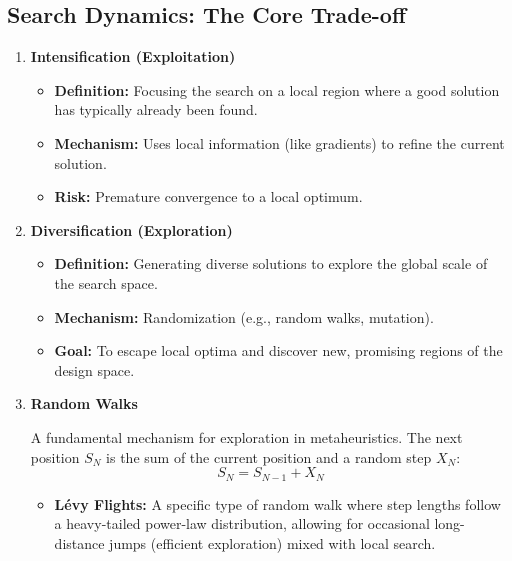 \documentclass[12pt]{article}
\begin{document}
\subsection{Search Dynamics: The Core Trade-off}
\begin{enumerate}
    \item \textbf{Intensification (Exploitation)}
          \begin{itemize}
              \item \textbf{Definition:} Focusing the search on a local region where a good solution has typically already been found.
              \item \textbf{Mechanism:} Uses local information (like gradients) to refine the current solution.
              \item \textbf{Risk:} Premature convergence to a local optimum.
          \end{itemize}

    \item \textbf{Diversification (Exploration)}
          \begin{itemize}
              \item \textbf{Definition:} Generating diverse solutions to explore the global scale of the search space.
              \item \textbf{Mechanism:} Randomization (e.g., random walks, mutation).
              \item \textbf{Goal:} To escape local optima and discover new, promising regions of the design space.
          \end{itemize}

    \item \textbf{Random Walks}

          A fundamental mechanism for exploration in metaheuristics. The next position $S_N$ is the sum of the current position and a random step $X_N$:
          \[
              S_N = S_{N-1} + X_N
          \]

          \begin{itemize}
              \item \textbf{Lévy Flights:} A specific type of random walk where step lengths follow a heavy-tailed power-law distribution, allowing for occasional long-distance jumps (efficient exploration) mixed with local search.
          \end{itemize}
\end{enumerate}
\end{document}
